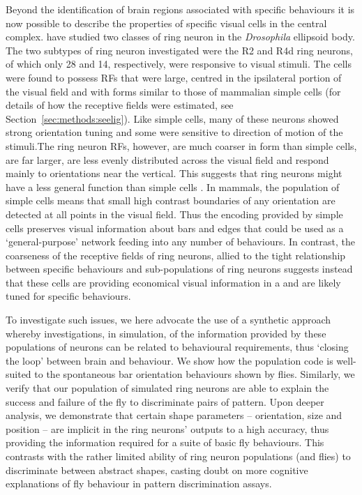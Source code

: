 Beyond the identification of brain regions associated with specific behaviours it is now possible to describe the properties of specific visual cells in the central complex.  have studied two classes of ring neuron in the \emph{Drosophila} ellipsoid body.
The two subtypes of ring neuron investigated were the R2 and R4d ring neurons, of which only 28 and 14, respectively, were responsive to visual stimuli.
The cells were found to possess \acp{RF} that were large, centred in the ipsilateral portion of the visual field and with forms similar to those of mammalian simple cells \cite{Hubel1962} (for details of how the receptive fields were estimated, see Section~\ref{sec:methods:seelig}).
Like simple cells, many of these neurons showed strong orientation tuning and some were sensitive to direction of motion of the stimuli.The ring neuron \acp{RF}, however, are much coarser in form than simple cells, are far larger, are less evenly distributed across the visual field and respond mainly to orientations near the vertical.
This suggests that ring neurons might have a less general function than simple cells \cite{Wystrach2014}.
In mammals, the population of simple cells means that small high contrast boundaries of any orientation are detected at all points in the visual field.
Thus the encoding provided by simple cells preserves visual information about bars and edges that could be used as a `general-purpose' network feeding into any number of behaviours.
In contrast, the coarseness of the receptive fields of ring neurons, allied to the tight relationship between specific behaviours and sub-populations of ring neurons suggests instead that these cells are providing economical visual information in a and are likely tuned for specific behaviours.

To investigate such issues, we here advocate the use of a synthetic approach whereby investigations, in simulation, of the information provided by these populations of neurons can be related to behavioural requirements, thus `closing the loop' between brain and behaviour. We show how the population code is well-suited to the spontaneous bar orientation behaviours shown by flies. Similarly, we verify that our population of simulated ring neurons are able to explain the success and failure of the fly to discriminate pairs of pattern.
Upon deeper analysis, we demonstrate that certain shape parameters -- orientation, size and position -- are implicit in the ring neurons' outputs to a high accuracy, thus providing the information required for a suite of basic fly behaviours.
This contrasts with the rather limited ability of ring neuron populations (and flies) to discriminate between abstract shapes, casting doubt on more cognitive explanations of fly behaviour in pattern discrimination assays.
